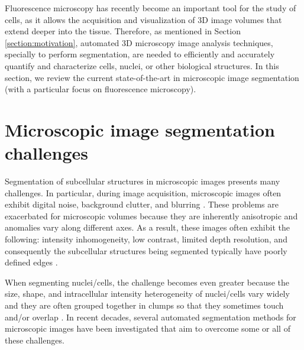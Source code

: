 \label{chapter:state_of_the_art}

Fluorescence microscopy has recently become an important tool for the study of cells, as it allows the acquisition and visualization of \ac{3D} image volumes that extend deeper into the tissue. Therefore, as mentioned in Section \ref{section:motivation}, automated \ac{3D} microscopy image analysis techniques, specially to perform segmentation, are needed to efficiently and accurately quantify and characterize cells, nuclei, or other biological structures. In this section, we review the current state-of-the-art in microscopic image segmentation (with a particular focus on fluorescence microscopy).


\section{Microscopic image segmentation challenges}

Segmentation of subcellular structures in microscopic images presents many challenges. In particular, during image acquisition, microscopic images often exhibit digital noise, background clutter, and blurring \cite{review:robust}. These problems are exacerbated for microscopic volumes because they are inherently anisotropic and anomalies vary along different axes. As a result, these images often exhibit the following: intensity inhomogeneity, low contrast, limited depth resolution, and consequently the subcellular structures being segmented typically have poorly defined edges \cite{active:inhmo}. 

When segmenting nuclei/cells, the challenge becomes even greater because the size, shape, and intracellular intensity heterogeneity of nuclei/cells vary widely and they are often grouped together in clumps so that they sometimes touch and/or overlap \cite{review:robust}. In recent decades, several automated segmentation methods for microscopic images have been investigated that aim to overcome some or all of these challenges.


